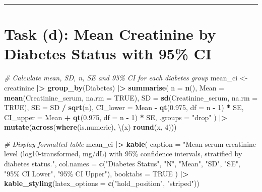 \documentclass[
  12pt,
]{article}
\newenvironment{Shaded}{\begin{snugshade}}{\end{snugshade}}
\newcommand{\AttributeTok}[1]{\textcolor[rgb]{0.13,0.29,0.53}{#1}}
\newcommand{\CommentTok}[1]{\textcolor[rgb]{0.56,0.35,0.01}{\textit{#1}}}
\newcommand{\ConstantTok}[1]{\textcolor[rgb]{0.56,0.35,0.01}{#1}}
\newcommand{\DecValTok}[1]{\textcolor[rgb]{0.00,0.00,0.81}{#1}}
\newcommand{\FloatTok}[1]{\textcolor[rgb]{0.00,0.00,0.81}{#1}}
\newcommand{\FunctionTok}[1]{\textcolor[rgb]{0.13,0.29,0.53}{\textbf{#1}}}
\newcommand{\NormalTok}[1]{#1}
\newcommand{\OtherTok}[1]{\textcolor[rgb]{0.56,0.35,0.01}{#1}}
\newcommand{\SpecialCharTok}[1]{\textcolor[rgb]{0.81,0.36,0.00}{\textbf{#1}}}
\newcommand{\StringTok}[1]{\textcolor[rgb]{0.31,0.60,0.02}{#1}}
\begin{document}
\begin{center}\rule{0.5\linewidth}{0.5pt}\end{center}

\hypertarget{task-d-mean-creatinine-by-diabetes-status-with-95-ci}{%
\section{Task (d): Mean Creatinine by Diabetes Status with 95\%
CI}\label{task-d-mean-creatinine-by-diabetes-status-with-95-ci}}

\begin{Shaded}
\begin{Highlighting}[]
\CommentTok{\# Calculate mean, SD, n, SE and 95\% CI for each diabetes group}
\NormalTok{mean\_ci }\OtherTok{\textless{}{-}}\NormalTok{ creatinine }\SpecialCharTok{|\textgreater{}}
  \FunctionTok{group\_by}\NormalTok{(Diabetes) }\SpecialCharTok{|\textgreater{}}
  \FunctionTok{summarise}\NormalTok{(}
    \AttributeTok{n        =} \FunctionTok{n}\NormalTok{(),}
    \AttributeTok{Mean     =} \FunctionTok{mean}\NormalTok{(Creatinine\_serum, }\AttributeTok{na.rm =} \ConstantTok{TRUE}\NormalTok{),}
    \AttributeTok{SD       =} \FunctionTok{sd}\NormalTok{(Creatinine\_serum,   }\AttributeTok{na.rm =} \ConstantTok{TRUE}\NormalTok{),}
    \AttributeTok{SE       =}\NormalTok{ SD }\SpecialCharTok{/} \FunctionTok{sqrt}\NormalTok{(n),}
    \AttributeTok{CI\_lower =}\NormalTok{ Mean }\SpecialCharTok{{-}} \FunctionTok{qt}\NormalTok{(}\FloatTok{0.975}\NormalTok{, }\AttributeTok{df =}\NormalTok{ n }\SpecialCharTok{{-}} \DecValTok{1}\NormalTok{) }\SpecialCharTok{*}\NormalTok{ SE,}
    \AttributeTok{CI\_upper =}\NormalTok{ Mean }\SpecialCharTok{+} \FunctionTok{qt}\NormalTok{(}\FloatTok{0.975}\NormalTok{, }\AttributeTok{df =}\NormalTok{ n }\SpecialCharTok{{-}} \DecValTok{1}\NormalTok{) }\SpecialCharTok{*}\NormalTok{ SE,}
    \AttributeTok{.groups  =} \StringTok{"drop"}
\NormalTok{  ) }\SpecialCharTok{|\textgreater{}}
  \FunctionTok{mutate}\NormalTok{(}\FunctionTok{across}\NormalTok{(}\FunctionTok{where}\NormalTok{(is.numeric), \textbackslash{}(x) }\FunctionTok{round}\NormalTok{(x, }\DecValTok{4}\NormalTok{)))}

\CommentTok{\# Display formatted table}
\NormalTok{mean\_ci }\SpecialCharTok{|\textgreater{}}
  \FunctionTok{kable}\NormalTok{(}
    \AttributeTok{caption  =} \StringTok{"Mean serum creatinine level (log10{-}transformed, mg/dL) with 95\% confidence intervals, stratified by diabetes status."}\NormalTok{,}
    \AttributeTok{col.names =} \FunctionTok{c}\NormalTok{(}\StringTok{"Diabetes Status"}\NormalTok{, }\StringTok{"N"}\NormalTok{, }\StringTok{"Mean"}\NormalTok{, }\StringTok{"SD"}\NormalTok{, }\StringTok{"SE"}\NormalTok{, }\StringTok{"95\% CI Lower"}\NormalTok{, }\StringTok{"95\% CI Upper"}\NormalTok{),}
    \AttributeTok{booktabs  =} \ConstantTok{TRUE}
\NormalTok{  ) }\SpecialCharTok{|\textgreater{}}
  \FunctionTok{kable\_styling}\NormalTok{(}\AttributeTok{latex\_options =} \FunctionTok{c}\NormalTok{(}\StringTok{"hold\_position"}\NormalTok{, }\StringTok{"striped"}\NormalTok{))}
\end{Highlighting}
\end{Shaded}
\end{document}
